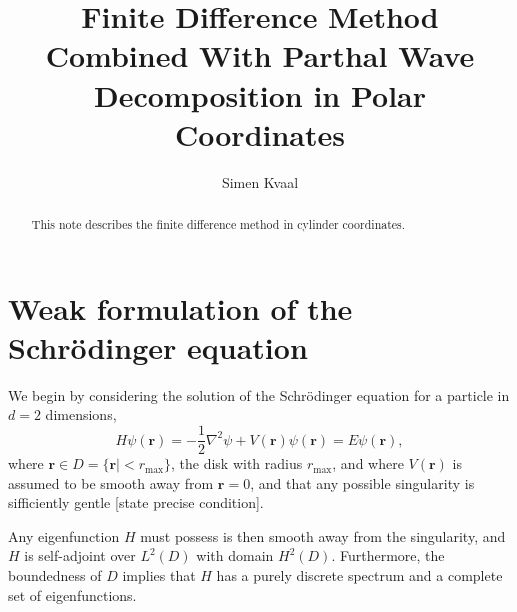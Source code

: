 \documentclass[12pt]{article}
\begin{document}

\title{Finite Difference Method Combined With Parthal Wave Decomposition in Polar Coordinates}
\author{Simen Kvaal}

\begin{abstract}
This note describes the finite difference method in cylinder coordinates.
\end{abstract}

\maketitle


\section{Weak formulation of the Schr\"odinger equation}

We begin by considering the solution of the Schr\"odinger equation for a particle in $d=2$ dimensions,
\begin{equation}
    H\psi(\mathbf{r}) = -\frac{1}{2} \nabla^2 \psi + V(\mathbf{r}) \psi(\mathbf{r}) = E \psi(\mathbf{r}),
\end{equation}
where $\mathbf{r} \in D = \{ \mathbf{r}| < r_\text{max} \}$, the disk with radius $r_\text{max}$, and where $V(\mathbf{r})$ is assumed to be smooth away from $\mathbf{r}=0$, and that any possible singularity is sifficiently gentle [state precise condition].

Any eigenfunction $H$ must possess is then smooth away from the singularity, and $H$ is self-adjoint over $L^2(D)$ with domain $H^2(D)$. Furthermore, the boundedness of $D$ implies that $H$ has a purely discrete spectrum and a complete set of eigenfunctions.
\end{document}
